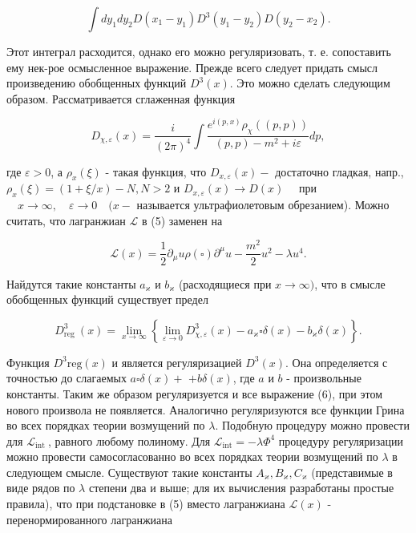 \documentclass[10pt]{article}
\begin{document}
\[

\int d y_{1} d y_{2} D\left(x_{1}-y_{1}\right) D^{3}\left(y_{1}-y_{2}\right) D\left(y_{2}-x_{2}\right) .

\]



Этот интеграл расходится, однако его можно регуляризовать, т. е. сопоставить ему нек-рое осмысленное выражение. Прежде всего следует придать смысл произведению обобщенных функций $D^{3}(x)$. Это можно сделать следующим образом. Рассматривается сглаженная функция



\[

D_{\chi, \varepsilon}(x)=\frac{i}{(2 \pi)^{4}} \int \frac{e^{i(p, x)} \rho_{\chi}((p, p))}{(p, p)-m^{2}+i \varepsilon} d p,

\]



где $\varepsilon>0$, а $\rho_{x}(\xi)$ - такая функция, что $D_{x, \varepsilon}(x)-$ достаточно гладкая, напр., $\rho_{x}(\xi)=(1+\xi / x)-N, N>2$ и $D_{x, \varepsilon}(x) \rightarrow D(x) \quad$ при $\quad x \rightarrow \infty, \quad \varepsilon \rightarrow 0 \quad(x-$ называется ультрафиолетовым обрезанием). Можно считать, что лагранжиан $\mathscr{L}$ в (5) заменен на



\[

\mathscr{L}(x)=\frac{1}{2} \partial_{\mu} u \rho(\square) \partial^{\mu} u-\frac{m^{2}}{2} u^{2}-\lambda u^{4} .

\]



Найдутся такие константы $a_{\varkappa}$ и $b_{\varkappa}$ (расходящиеся при $x \rightarrow \infty)$, что в смысле обобщенных функций существует предел



\[

D_{\text {reg }}^{3}(x)=\lim _{x \rightarrow \infty}\left\{\lim _{\varepsilon \rightarrow 0} D_{\chi, \varepsilon}^{3}(x)-a_{\varkappa} \square \delta(x)-b_{\varkappa} \delta(x)\right\} .

\]



Функция $D^{3} \mathrm{reg}(x)$ и является регуляризацией $D^{3}(x)$. Она определяется с точностью до слагаемых $a \square \delta(x)+$ $+b \delta(x)$, где $a$ и $b$ - произвольные константы. Таким же образом регуляризуется и все выражение (6), при этом нового произвола не появляется. Аналогично регуляризуются все функции Грина во всех порядках теории возмущений по $\lambda$. Подобную процедуру можно провести для $\mathscr{L}_{\text {int }}$, равного любому полиному. Для $\mathscr{\mathscr { L }}_{\mathrm{int}}=-\lambda \Phi^{4}$ процедуру регуляризации можно провести самосогласованно во всех порядках теории возмущений по $\lambda$ в следующем смысле. Существуют такие константы $A_{\varkappa}, B_{\varkappa}, C_{\varkappa}$ (представимые в виде рядов по $\lambda$ степени два и выше; для их вычисления разработаны простые правила), что при подстановке в (5) вместо лагранжиана $\mathscr{L}(x)$ - перенормированного лагранжиана
\end{document}
